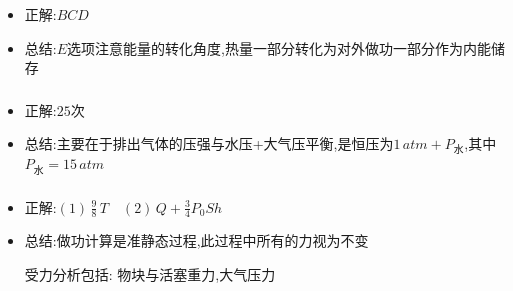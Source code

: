 \documentclass{article}
\begin{document}
\subsubsection{}
\begin{itemize}
    \item 正解:\quad $BCD$
    \item 总结:\quad $E$选项注意能量的转化角度,热量一部分转化为对外做功一部分作为内能储存
\end{itemize}

\vspace{2em}

\subsubsection{}
\begin{itemize}
    \item 正解:\quad $25$次
    \item 总结:\quad 主要在于排出气体的压强与水压+大气压平衡,是恒压为$1 \, atm + P_{\text{水}}$,其中$P_{\text{水}} = 15 \, atm$
\end{itemize}

\vspace{2em}

\subsubsection{}
\begin{itemize}
    \item 正解:\quad $(1) \, \frac{9}{8} \, T \quad (2) \,  Q + \frac{3}{4}P_{0}Sh$
    \item 总结:\quad 做功计算是准静态过程,此过程中所有的力视为不变
    
    \hspace{3.2em}受力分析包括: 物块与活塞重力,大气压力
\end{itemize}
\end{document}
